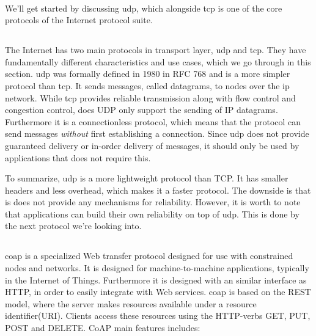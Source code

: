 \paragraph{}

 We'll get started by discussing \gls{udp}, which alongside \gls{tcp} is one of
 the core protocols of the Internet protocol suite.


\subsection{}

The Internet has two main protocols in transport layer, \gls{udp} and \gls{tcp}.
They have fundamentally different characteristics and use cases, which we go
through in this section. \gls{udp} was formally defined in 1980 in RFC
768\cite{rfc-udp} and is a more simpler protocol than \gls{tcp}. It sends
messages, called datagrams, to nodes over the \gls{ip} network. While \gls{tcp}
provides reliable transmission along with flow control and congestion control,
does UDP only support the sending of IP datagrams. Furthermore it is a connectionless
protocol, which means that the protocol can send messages \textit{without} first
establishing a connection. Since \gls{udp} does not provide guaranteed delivery
or in-order delivery of messages, it should only be used by applications that
does not require this.

To summarize, \gls{udp} is a more lightweight protocol than TCP. It has smaller
headers and less overhead, which makes it a faster protocol. The downside is that
is does not provide any mechanisms for reliability. However, it is worth to note
that applications can build their own reliability on top of \gls{udp}. This is
done by the next protocol we're looking into.

\subsection{}

\gls{coap} is a specialized Web transfer protocol designed for use with
constrained nodes and  networks\cite{rfc-7252}. It is designed for
machine-to-machine applications, typically in the Internet of Things.
Furthermore it is designed with an similar interface as HTTP, in order to easily
integrate with Web services. \gls{coap} is based on the REST model, where the
server makes resources available  under a resource identifier(URI). Clients
access these resources using the HTTP-verbs GET, PUT, POST and DELETE. CoAP main
features includes:

